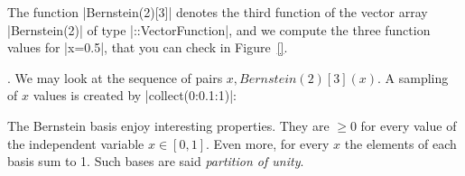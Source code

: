 \begin{coding} The function |Bernstein(2)[3]| denotes the third  function of the vector array |Bernstein(2)| of type |::Vector{Function}|, and we compute the three function values for |x=0.5|, that you can check in Figure~\ref{}.


\end{coding}



\begin{coding}. We may look at the sequence of pairs $x, Bernstein(2)[3](x)$. A sampling of $x$ values is created by |collect(0:0.1:1)|:

\end{coding}



The Bernstein basis enjoy interesting properties. They are $\geq 0$ for every value of the independent variable $x\in [0,1]$. Even more, for every $x$ the elements of each basis sum to 1. Such bases are said \emph{partition of unity}. 

